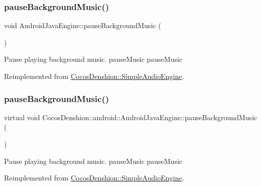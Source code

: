 \subsubsection{\texorpdfstring{pause\+Background\+Music()}{pauseBackgroundMusic()}\hspace{0.1cm}{\footnotesize\ttfamily [1/2]}}
{\footnotesize\ttfamily void Android\+Java\+Engine\+::pause\+Background\+Music (\begin{DoxyParamCaption}{ }\end{DoxyParamCaption})\hspace{0.3cm}{\ttfamily [virtual]}}

Pause playing background music.  pause\+Music  pause\+Music 

Reimplemented from \hyperlink{classCocosDenshion_1_1SimpleAudioEngine_addf0536bfbb9ad38668108ee289ccaf6}{Cocos\+Denshion\+::\+Simple\+Audio\+Engine}.

\mbox{\label{classCocosDenshion_1_1android_1_1AndroidJavaEngine_a0a1f417bca73e4c63e261046948cf23f}} 
\subsubsection{\texorpdfstring{pause\+Background\+Music()}{pauseBackgroundMusic()}\hspace{0.1cm}{\footnotesize\ttfamily [2/2]}}
{\footnotesize\ttfamily virtual void Cocos\+Denshion\+::android\+::\+Android\+Java\+Engine\+::pause\+Background\+Music (\begin{DoxyParamCaption}{ }\end{DoxyParamCaption})\hspace{0.3cm}{\ttfamily [virtual]}}

Pause playing background music.  pause\+Music  pause\+Music 

Reimplemented from \hyperlink{classCocosDenshion_1_1SimpleAudioEngine_addf0536bfbb9ad38668108ee289ccaf6}{Cocos\+Denshion\+::\+Simple\+Audio\+Engine}.

\mbox{\label{classCocosDenshion_1_1android_1_1AndroidJavaEngine_a6fae84fc04d9e8ae2e38684f616df9e9}} 
